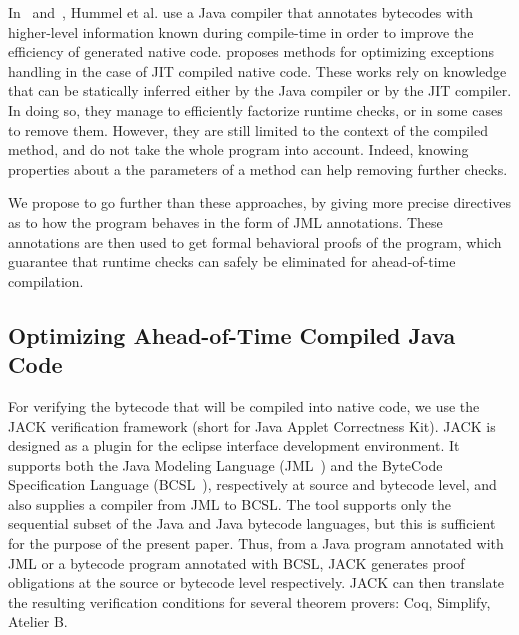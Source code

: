 In~\cite{Hummel1997} and~\cite{Azevedo1999}, Hummel et al. use a Java compiler that annotates bytecodes with higher-level information known during compile-time in order to improve the efficiency of generated native code. \cite{Ishizaki1999} proposes methods for optimizing exceptions handling in the case of JIT compiled native code. These works rely on knowledge that can be statically inferred either by the Java compiler or by the JIT compiler. In doing so, they manage to efficiently factorize runtime checks, or in some cases to remove them. However, they are still limited to the context of the compiled method, and do not take the whole program into account. Indeed, knowing properties about a the parameters of a method can help removing further checks.

We propose to go further than these approaches, by giving more precise directives as to how the program behaves in the form of JML annotations. These annotations are then used to get formal behavioral proofs of the program, which guarantee that runtime checks can safely be eliminated for ahead-of-time compilation.

\subsection{Optimizing Ahead-of-Time Compiled Java Code}
\label{sec:method}

For verifying the bytecode that will be compiled into native code, we use the JACK verification framework (short for Java Applet Correctness Kit). JACK is designed as a plugin for the eclipse interface development environment. It supports both the Java Modeling Language (JML~\cite{Leavens2005}) and the ByteCode Specification Language (BCSL~\cite{JBL05MP}), respectively at source and bytecode level, and also supplies a compiler from JML to BCSL. The tool supports only the sequential subset of the Java and Java bytecode languages, but this is sufficient for the purpose of the present paper. Thus, from a Java program annotated with JML or a bytecode program annotated with BCSL, JACK generates proof obligations at the source or bytecode level respectively. JACK can then translate the resulting verification conditions for several theorem provers: Coq, Simplify, Atelier B.

